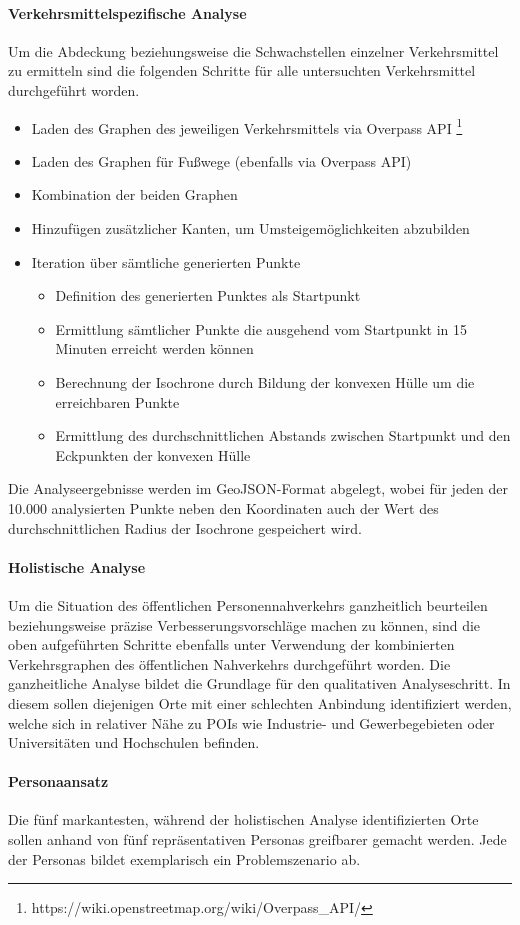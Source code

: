 \paragraph*{Verkehrsmittelspezifische Analyse}
\label{verkehrsmittelspezifische_analyse}

Um die Abdeckung beziehungsweise die Schwachstellen einzelner Verkehrsmittel zu ermitteln sind die folgenden Schritte für alle untersuchten Verkehrsmittel durchgeführt worden.

\begin{itemize}
    \item Laden des Graphen des jeweiligen Verkehrsmittels via Overpass API \footnote{https://wiki.openstreetmap.org/wiki/Overpass\_API/}
    \item Laden des Graphen für Fußwege (ebenfalls via Overpass API)
    \item Kombination der beiden Graphen
    \item Hinzufügen zusätzlicher Kanten, um Umsteigemöglichkeiten abzubilden
    \item Iteration über sämtliche generierten Punkte

    \begin{itemize}
        \item Definition des generierten Punktes als Startpunkt
        \item Ermittlung sämtlicher Punkte die ausgehend vom Startpunkt in 15 Minuten erreicht werden können
        \item Berechnung der Isochrone durch Bildung der konvexen Hülle um die erreichbaren Punkte
        \item Ermittlung des durchschnittlichen Abstands zwischen Startpunkt und den Eckpunkten der konvexen Hülle
    \end{itemize}

\end{itemize}

Die Analyseergebnisse werden im GeoJSON-Format abgelegt, wobei für jeden der 10.000 analysierten Punkte neben den Koordinaten auch der Wert des durchschnittlichen Radius der Isochrone gespeichert wird.

\paragraph*{Holistische Analyse}
\label{holistische_analyse}

Um die Situation des öffentlichen Personennahverkehrs ganzheitlich beurteilen beziehungsweise präzise Verbesserungsvorschläge machen zu können, sind die oben aufgeführten Schritte ebenfalls unter Verwendung der kombinierten Verkehrsgraphen des öffentlichen Nahverkehrs durchgeführt worden. Die ganzheitliche Analyse bildet die Grundlage für den qualitativen Analyseschritt. In diesem sollen diejenigen Orte mit einer schlechten Anbindung identifiziert werden, welche sich in relativer Nähe zu \acp{POI} wie Industrie- und Gewerbegebieten oder Universitäten und Hochschulen befinden.

\paragraph*{Personaansatz}
\label{personaansatz}

Die fünf markantesten, während der holistischen Analyse identifizierten Orte sollen anhand von fünf repräsentativen Personas greifbarer gemacht werden. Jede der Personas bildet exemplarisch ein Problemszenario ab.
